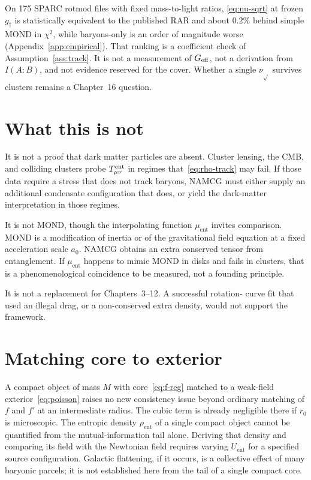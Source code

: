 On 175 SPARC rotmod files with fixed mass-to-light ratios,
\eqref{eq:nu-sqrt} at frozen \(g_\dagger\) is statistically
equivalent to the published RAR and about \(0.2\%\) behind
simple MOND in \(\chi^2\), while baryons-only is an order of
magnitude worse (Appendix~\ref{app:empirical}). That ranking
is a coefficient check of Assumption~\ref{ass:track}. It is
not a measurement of \(G_{\mathrm{eff}}\), not a derivation from
\(I(A:B)\), and not evidence reserved for the cover.
Whether a single \(\nu_{\sqrt{}}\) survives clusters remains
a Chapter~16 question.

\section{What this is not}
\label{sec:ch13-not}

It is not a proof that dark matter particles are absent. Cluster
lensing, the CMB, and colliding clusters probe \(T^{\mathrm{ent}}_{\mu\nu}\)
in regimes that~\eqref{eq:rho-track} may fail. If those data
require a stress that does not track baryons, NAMCG must either
supply an additional condensate configuration that does, or yield
the dark-matter interpretation in those regimes.

It is not MOND, though the interpolating function
\(\mu_{\mathrm{ent}}\) invites comparison. MOND is a modification
of inertia or of the gravitational field equation at a fixed
acceleration scale \(a_0\). NAMCG obtains an extra conserved
tensor from entanglement. If \(\mu_{\mathrm{ent}}\) happens to
mimic MOND in disks and fails in clusters, that is a phenomenological
coincidence to be measured, not a founding principle.

It is not a replacement for Chapters~3--12. A successful rotation-
curve fit that used an illegal drag, or a non-conserved extra
density, would not support the framework.

\section{Matching core to exterior}
\label{sec:ch13-match}

A compact object of mass \(M\) with core~\eqref{eq:f-reg} matched
to a weak-field exterior~\eqref{eq:poisson} raises no new
consistency issue beyond ordinary matching of \(f\) and \(f'\) at
an intermediate radius. The cubic term is already negligible
there if \(r_0\) is microscopic. The entropic density \(\rho_{\mathrm{ent}}\) of a single compact
object cannot be quantified from the mutual-information tail alone.
Deriving that density and comparing its field with the Newtonian
field requires varying \(U_{\mathrm{ent}}\) for a specified source
configuration. Galactic flattening, if it occurs, is a collective
effect of many baryonic parcels; it is not established here from
the tail of a single compact core.


